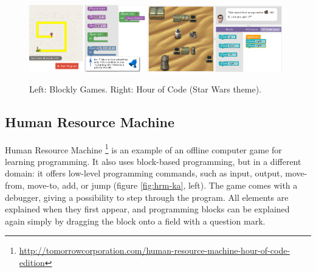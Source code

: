 
\begin{figure}[htb]
\begin{center}
  \includegraphics[width=0.45\textwidth]{img/blockly-nested}
  \includegraphics[width=0.52\textwidth]{img/hour-of-code-sw}
\end{center}
\caption{%
  Left: Blockly Games.
  Right: Hour of Code (Star Wars theme).}
\label{fig:blockly-hoc}
\end{figure}

\subsection{Human Resource Machine}
\label{sec:human-resource-machine}
Human Resource Machine%
\footnote{\url{http://tomorrowcorporation.com/human-resource-machine-hour-of-code-edition}}
is an example of an offline computer game for learning programming.
It also uses block-based programming, but in a different domain:
it offers low-level programming commands, such as
input, output, move-from, move-to, add, or jump
(figure \ref{fig:hrm-ka}, left).
The game comes with a debugger, giving a possibility to step through the program.
All elements are explained when they first appear, and programming blocks can
be explained again simply by dragging the block onto a field with a question
mark.


